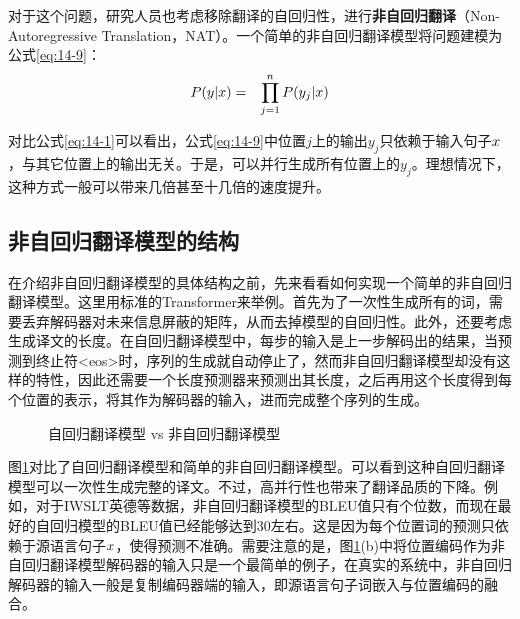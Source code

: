\parinterval 对于这个问题，研究人员也考虑移除翻译的自回归性，进行{\small\sffamily\bfseries{非自回归翻译}}（Non-Autoregressive Translation，NAT）。一个简单的非自回归翻译模型将问题建模为公式\eqref{eq:14-9}：
\begin{eqnarray}
{P}({y}|{x}) &=& \prod_{j=1}^n {{P}(y_j|{x})}
\label{eq:14-9}
\end{eqnarray}

\parinterval 对比公式\eqref{eq:14-1}可以看出，公式\eqref{eq:14-9}中位置$j$上的输出$y_j$只依赖于输入句子${x}$，与其它位置上的输出无关。于是，可以并行生成所有位置上的${y_j}$。理想情况下，这种方式一般可以带来几倍甚至十几倍的速度提升。


\subsection{非自回归翻译模型的结构}

\parinterval 在介绍非自回归翻译模型的具体结构之前，先来看看如何实现一个简单的非自回归翻译模型。这里用标准的Transformer来举例。首先为了一次性生成所有的词，需要丢弃解码器对未来信息屏蔽的矩阵，从而去掉模型的自回归性。此外，还要考虑生成译文的长度。在自回归翻译模型中，每步的输入是上一步解码出的结果，当预测到终止符<eos>时，序列的生成就自动停止了，然而非自回归翻译模型却没有这样的特性，因此还需要一个长度预测器来预测出其长度，之后再用这个长度得到每个位置的表示，将其作为解码器的输入，进而完成整个序列的生成。

\begin{figure}[htp]
\centering
 
\caption{自回归翻译模型 vs 非自回归翻译模型}
\label{fig:14-12}
\end{figure}

\parinterval 图\ref{fig:14-12}对比了自回归翻译模型和简单的非自回归翻译模型。可以看到这种自回归翻译模型可以一次性生成完整的译文。不过，高并行性也带来了翻译品质的下降。例如，对于IWSLT英德等数据，非自回归翻译模型的BLEU值只有个位数，而现在最好的自回归模型的BLEU值已经能够达到30左右。这是因为每个位置词的预测只依赖于源语言句子${x}$，使得预测不准确。需要注意的是，图\ref{fig:14-12}(b)中将位置编码作为非自回归翻译模型解码器的输入只是一个最简单的例子，在真实的系统中，非自回归解码器的输入一般是复制编码器端的输入，即源语言句子词嵌入与位置编码的融合。


